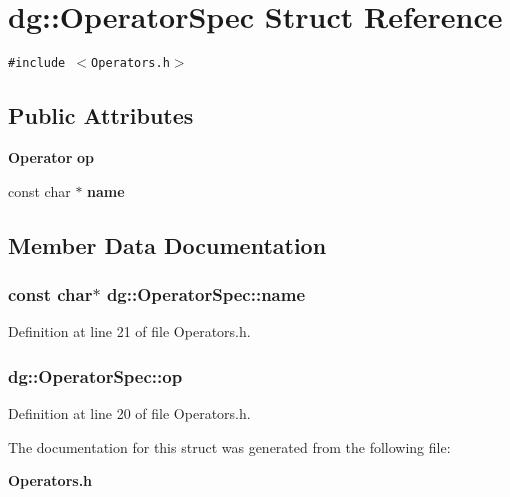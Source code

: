 \section{dg::Operator\-Spec Struct Reference}
\label{structdg_1_1OperatorSpec}
{\tt \#include $<$Operators.h$>$}

\subsection*{Public Attributes}
\begin{CompactItemize}
\item 
{\bf Operator} {\bf op}
\item 
const char $\ast$ {\bf name}
\end{CompactItemize}


\subsection{Member Data Documentation}
\subsubsection{\setlength{\rightskip}{0pt plus 5cm}const char$\ast$ dg::Operator\-Spec::name}\label{structdg_1_1OperatorSpec_m1}




Definition at line 21 of file Operators.h.
\subsubsection{ dg::Operator\-Spec::op}\label{structdg_1_1OperatorSpec_m0}




Definition at line 20 of file Operators.h.

The documentation for this struct was generated from the following file:\begin{CompactItemize}
\item 
{\bf Operators.h}\end{CompactItemize}
